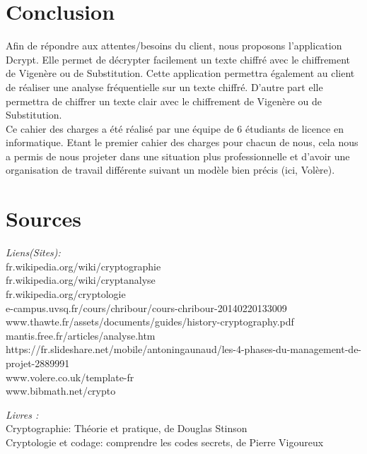 \documentclass[a4]{article}
\begin{document}
	\section{Conclusion}
		Afin de répondre aux attentes/besoins du client, nous proposons l'application Dcrypt.
		Elle permet de décrypter facilement un texte chiffré avec le chiffrement de Vigenère ou de 
		Substitution. Cette application permettra également au client de réaliser une analyse fréquentielle sur 
		un texte chiffré. D'autre part elle permettra de chiffrer un texte clair avec le chiffrement de Vigenère ou de
		Substitution. \\
		Ce cahier des charges a été réalisé par une équipe de 6 étudiants de licence en informatique.
		Etant le premier cahier des charges pour chacun de nous, cela nous a permis de nous
		projeter dans une situation plus professionnelle et d'avoir une organisation de travail
		différente suivant un modèle bien précis (ici, Volère).
		
	\newpage
	\section{Sources}
		\textit{Liens(Sites):}\\
		fr.wikipedia.org/wiki/cryptographie\\
		fr.wikipedia.org/wiki/cryptanalyse\\
		fr.wikipedia.org/cryptologie\\
		e-campus.uvsq.fr/cours/chribour/cours-chribour-20140220133009\\
		www.thawte.fr/assets/documents/guides/history-cryptography.pdf\\
		mantis.free.fr/articles/analyse.htm\\
		https://fr.slideshare.net/mobile/antoningaunaud/les-4-phases-du-management-de-projet-2889991\\
		www.volere.co.uk/template-fr\\
		www.bibmath.net/crypto

		\textit{Livres :}\\
		Cryptographie: Théorie et pratique, de Douglas Stinson\\
		Cryptologie et codage: comprendre les codes secrets, de Pierre Vigoureux
\end{document}
